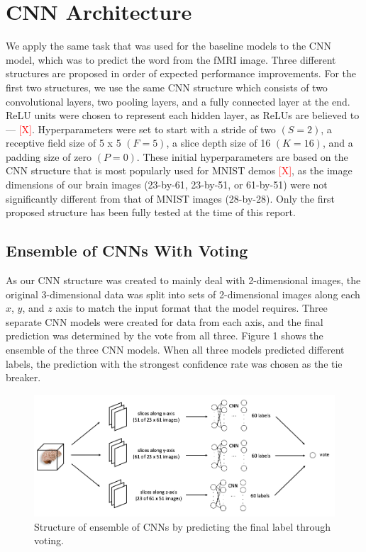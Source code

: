 \documentclass{article} %
\begin{document}
\section{CNN Architecture}

We apply the same task that was used for the baseline models to the CNN model, which was to predict the word from the fMRI image. Three different structures are proposed in order of expected performance improvements. For the first two structures, we use the same CNN structure which consists of two convolutional layers, two pooling layers, and a fully connected layer at the end. ReLU units were chosen to represent each hidden layer, as ReLUs are believed to --- \textcolor{red}{[X]}. Hyperparameters were set to start with a stride of two $(S=2)$, a receptive field size of 5 x 5 $(F=5)$, a slice depth size of 16 $(K=16)$, and a padding size of zero $(P=0)$. These initial hyperparameters are based on the CNN structure that is most popularly used for MNIST demos \textcolor{red}{[X]}, as the image dimensions of our brain images (23-by-61, 23-by-51, or 61-by-51) were not significantly different from that of MNIST images (28-by-28). Only the first proposed structure has been fully tested at the time of this report.

\subsection{Ensemble of CNNs With Voting}

As our CNN structure was created to mainly deal with 2-dimensional images, the original 3-dimensional data was split into sets of 2-dimensional images along each $x$, $y$, and $z$ axis to match the input format that the model requires. Three separate CNN models were created for data from each axis, and the final prediction was determined by the vote from all three. Figure 1 shows the ensemble of the three CNN models. When all three models predicted different labels, the prediction with the strongest confidence rate was chosen as the tie breaker.

\begin{figure}[H]
	\centering
	\includegraphics[height=0.26\textheight]{./img/cnn_proto_a.png}
	\caption{Structure of ensemble of CNNs by predicting the final label through voting.}
\end{figure}
\end{document}
